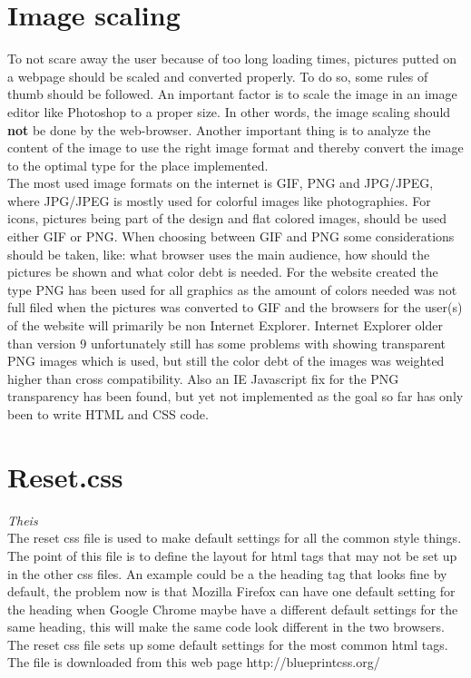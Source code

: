 \section{Image scaling}
To not scare away the user because of too long loading times, pictures putted on a webpage should be scaled and converted properly. To do so, some rules of thumb should be followed. An important factor is to scale the image in an image editor like Photoshop to a proper size. In other words, the image scaling should \textbf{not} be done by the web-browser. Another important thing is to analyze the content of the image to use the right image format and thereby convert the image to the optimal type for the place implemented.
\\The most used image formats on the internet is GIF, PNG and JPG/JPEG, where JPG/JPEG is mostly used for colorful images like photographies. For icons, pictures being part of the design and flat colored images, should be used either GIF or PNG. When choosing between GIF and PNG some considerations should be taken, like: what browser uses the main audience, how should the pictures be shown and what color debt is needed. For the website created the type PNG has been used for all graphics as the amount of colors needed was not full filed when the pictures was converted to GIF and the browsers for the user(s) of the website will primarily be non Internet Explorer. Internet Explorer older than version 9 unfortunately still has some problems with showing transparent PNG images which is used, but still the color debt of the images was weighted higher than cross compatibility. Also an IE Javascript fix for the PNG transparency has been found, but yet not implemented as the goal so far has only been to write HTML and CSS code. 

\section{Reset.css} \textit{Theis}\\
The reset css file is used to make default settings for all the common style things. The point of this file is to define the layout for html tags that may not be set up in the other css files. An example could be a the heading tag that looks fine by default, the problem now is that Mozilla Firefox can have one default setting for the heading when Google Chrome maybe have a different default settings for the same heading, this will make the same code look different in the two browsers. The reset css file sets up some default settings for the most common html tags. The file is downloaded from this web page http://blueprintcss.org/